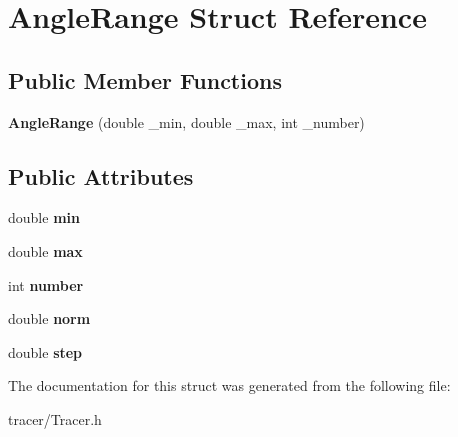 \hypertarget{struct_angle_range}{}\section{Angle\+Range Struct Reference}
\label{struct_angle_range}
\subsection*{Public Member Functions}
\begin{DoxyCompactItemize}
\item 
\mbox{\label{struct_angle_range_a1e06292811856a2dc9cbf549301ed75a}} 
{\bfseries Angle\+Range} (double \+\_\+min, double \+\_\+max, int \+\_\+number)
\end{DoxyCompactItemize}
\subsection*{Public Attributes}
\begin{DoxyCompactItemize}
\item 
\mbox{\label{struct_angle_range_a5ed72ddb7e883e7d2d69ce7fa8be2563}} 
double {\bfseries min}
\item 
\mbox{\label{struct_angle_range_af38a8ccf521d7d1cc1a75dad6862411e}} 
double {\bfseries max}
\item 
\mbox{\label{struct_angle_range_aaef49ba68e00ca42532d7e125a1be312}} 
int {\bfseries number}
\item 
\mbox{\label{struct_angle_range_a50723e28b1743ddd4300b76a427d612b}} 
double {\bfseries norm}
\item 
\mbox{\label{struct_angle_range_a0428fa2639bc62cead723624c4342c19}} 
double {\bfseries step}
\end{DoxyCompactItemize}


The documentation for this struct was generated from the following file\+:\begin{DoxyCompactItemize}
\item 
tracer/Tracer.\+h\end{DoxyCompactItemize}
